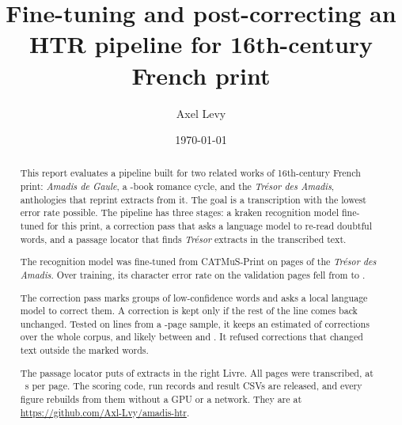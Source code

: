 \documentclass[11pt,a4paper]{article}
\title{Fine-tuning and post-correcting an HTR pipeline for
  16th-century French print}
\author{Axel Levy}
\date{\today}
\begin{document}
\reportmaketitle

\begin{abstract}
This report evaluates a pipeline built for two related works of 16th-century
French print: \emph{Amadis de Gaule}, a \ocrBooks{}-book romance cycle, and the
\emph{Trésor des Amadis}, anthologies that reprint extracts from it. The goal is a transcription with the lowest error
rate possible. The pipeline has three stages: a kraken recognition model
fine-tuned for this print, a correction pass that asks a language model to
re-read doubtful words, and a passage locator that finds \emph{Trésor} extracts
in the transcribed text.

The recognition model was fine-tuned from CATMuS-Print on \trainPages{} pages of
the \emph{Trésor des Amadis}. Over training, its character error rate on the
validation pages fell from \trainCerFirstEpoch{} to \trainCer{}.

The correction pass marks groups of low-confidence words and asks a local
language model to correct them. A correction is kept only if the rest of the
line comes back unchanged. Tested on \corrOffered{} lines from a
\corrPages{}-page sample, it keeps an estimated \corrAcceptRate{} of
corrections over the whole corpus, and likely between \corrAcceptLow{} and
\corrAcceptHigh{}. It refused \corrRewritesCaught{} corrections that changed
text outside the marked words.

The passage locator puts \locLivreAccuracyWorkbook{} of extracts in the right
Livre. All \ocrPages{} pages were
transcribed, at \ocrSecondsPerPage{}~s per page.
The scoring code, run records and result CSVs are released, and every figure
rebuilds from them without a GPU or a network. They are at
\url{https://github.com/Axl-Lvy/amadis-htr}.


\end{abstract}
\end{document}
